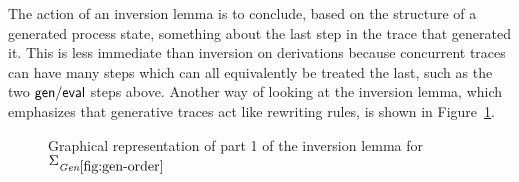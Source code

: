 The action of an inversion lemma is to conclude, based on the
structure of a generated process state, something about the last
step in the trace that generated it. This is less immediate than
inversion on derivations because concurrent traces can have many steps
which can all equivalently be treated the last, such as the two ${\sf
  gen/eval}$ steps above. Another way of looking at the inversion
lemma, which emphasizes that generative traces act like rewriting
rules, is shown in Figure~\ref{fig:show-inversion}.

\begin{figure}
\begin{center}
\end{center}
\caption{Graphical representation of part 1 of the inversion lemma
for $\siggenorder$}\label{fig:show-inversion}
\end{figure}

